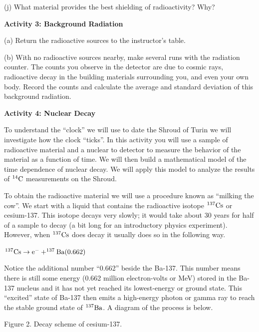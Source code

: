 (j) What material provides the best shielding of radioactivity? Why?
\vspace{15mm}

\textbf{Activity 3: Background Radiation}

(a) Return the radioactive sources to the instructor's table.

(b) With no radioactive sources nearby, make several runs with the radiation counter.
The counts you observe in the detector are due to cosmic rays, radioactive decay
in the building materials surrounding you, and even your own body.
Record the counts and calculate the average and standard deviation of this background
radiation.
\vspace{15mm}

\vspace{1.0in}


\textbf{Activity 4: Nuclear Decay }

To understand the ``clock'' we will use to date the Shroud of Turin we will investigate
how the clock ``ticks''.
In this activity you will use a sample of radioactive material and a nuclear to 
detector to measure the behavior of the material as a function of time.
We will then build a mathematical model of the time dependence of nuclear decay.
We will apply this model to analyze the results of $\rm ^{14}C$ measurements on
the Shroud.

To obtain the radioactive material we will use a procedure known as
``milking the cow''.
We start with a liquid that contains the radioactive isotope $\rm ^{137}Cs$ or
cesium-137.
This isotope decays very slowly; it would take about 30 years for half of a sample
to decay (a bit long for an introductory physics experiment).
However, when $\rm ^{137}Cs$ does decay it usually does so in the following way.

{\centering \( \rm ^{137}Cs \rightarrow e^- + ^{137}Ba(0.662) \) \par}

Notice the additional number ``0.662'' beside the Ba-137. This number means there
is still some energy (0.662 million electron-volts or MeV)
stored in the Ba-137 nucleus and it has not yet reached
its lowest-energy or ground state.
This ``excited'' state of Ba-137 then emits a high-energy photon or gamma ray to 
reach the stable ground state of $\rm {^{137}Ba}$. A diagram of the
process is below. 

\vspace{0.3cm}
{\centering {} \par}
{\centering Figure 2. Decay scheme of cesium-137. \par}
\vspace{0.3cm}

